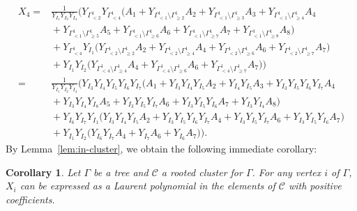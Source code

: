 \documentclass[pdftex]{sigma}
\numberwithin{equation}{section}
\newtheorem{Corollary}[Theorem]{Corollary}
\begin{document}
\begin{align*}
X_4={} & \frac{1}{Y_{I_1}Y_{I_2}Y_{I_4}}\big( Y_{\Gamma_{< 2}^1}Y_{\Gamma_{< 4}^1}\big(A_1+Y_{\Gamma_{< 1}^1\setminus\Gamma_{\geq 2}^1}A_2+Y_{\Gamma_{< 1}^1\setminus\Gamma_{\geq 3}^1}A_3+Y_{\Gamma_{< 1}^1\setminus\Gamma_{\geq 4}^1}A_4 \\
&{}+Y_{\Gamma_{< 1}^1\setminus\Gamma_{\geq 5}^1}A_5+Y_{\Gamma_{< 1}^1\setminus\Gamma_{\geq 6}^1}A_6+Y_{\Gamma_{< 1}^1\setminus\Gamma_{\geq 7}^1}A_7+Y_{\Gamma_{< 1}^1\setminus\Gamma_{\geq 8}^1}A_8\big) \\
&{}+ Y_{\Gamma_{< 4}^1}Y_{I_1}\big(Y_{\Gamma_{< 2}^1\setminus\Gamma_{\geq 2}^1}A_2+Y_{\Gamma_{< 2}^1\setminus\Gamma_{\geq 4}^1}A_4+Y_{\Gamma_{< 2}^1\setminus\Gamma_{\geq 6}^1}A_6+Y_{\Gamma_{< 2}^1\setminus\Gamma_{\geq 7}^1}A_7\big) \\
&{}+ Y_{I_1}Y_{I_2}\big(Y_{\Gamma_{< 4}^1\setminus\Gamma_{\geq 4}^1}A_4+Y_{\Gamma_{< 4}^1\setminus\Gamma_{\geq 6}^1}A_6+Y_{\Gamma_{< 4}^1\setminus\Gamma_{\geq 7}^1}A_7\big)\big)\\
={} & \frac{1}{Y_{I_1}Y_{I_2}Y_{I_4}}\big( Y_{I_3}Y_{I_4}Y_{I_5}Y_{I_6}Y_{I_7}\big(A_1+Y_{I_3}Y_{I_4}Y_{I_5}A_2+Y_{I_4}Y_{I_5}A_3+Y_{I_3}Y_{I_5}Y_{I_6}Y_{I_7}A_4 \\
&{}+ Y_{I_3}Y_{I_4}Y_{I_8}A_5+Y_{I_3}Y_{I_5}Y_{I_7}A_6+Y_{I_3}Y_{I_5}Y_{I_6}A_7+Y_{I_3}Y_{I_4}A_8\big)\\
&{} +Y_{I_6}Y_{I_7}Y_{I_1}\big(Y_{I_3}Y_{I_4}Y_{I_5}A_2 + Y_{I_3}Y_{I_5}Y_{I_6}Y_{I_7}A_4+Y_{I_3}Y_{I_5}Y_{I_7}A_6+Y_{I_3}Y_{I_5}Y_{I_6}A_7\big)\\
&{} +Y_{I_1}Y_{I_2}\big(Y_{I_6}Y_{I_7}A_4+Y_{I_7}A_6+Y_{I_6}A_7\big)\big).
\end{align*}
By Lemma~\ref{lem:in-cluster}, we obtain the following immediate corollary:
\begin{Corollary}\label{cor:X-pos}
Let $\Gamma$ be a tree and $\mathcal{C}$ a rooted cluster for $\Gamma$. For any vertex $i$ of $\Gamma$, $X_{i}$ can be expressed as a Laurent polynomial in the elements of $\mathcal{C}$ with positive coefficients.
\end{Corollary}
\end{document}
